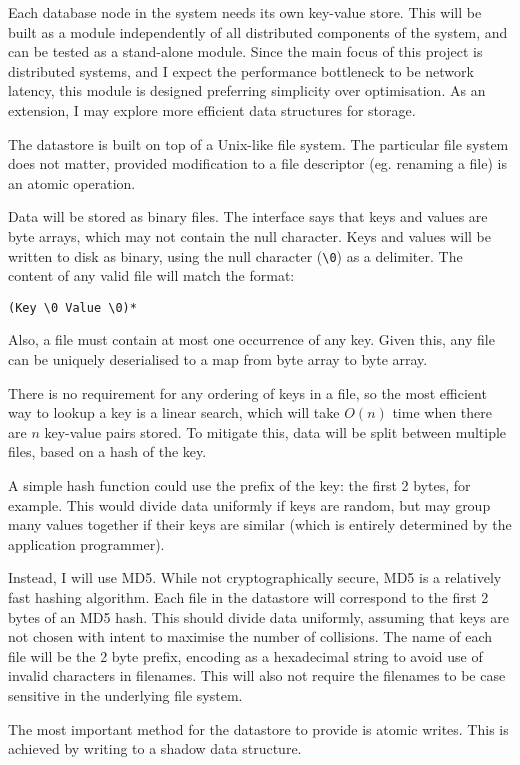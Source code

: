 \documentclass[12pt,a4paper,twoside,openright]{report}
\begin{document}
Each database node in the system needs its own key-value store. This will be built as a module independently of all distributed components of the system, and can be tested as a stand-alone module. Since the main focus of this project is distributed systems, and I expect the performance bottleneck to be network latency, this module is designed preferring simplicity over optimisation. As an extension, I may explore more efficient data structures for storage.

The datastore is built on top of a Unix-like file system. The particular file system does not matter, provided modification to a file descriptor (eg. renaming a file) is an atomic operation.

Data will be stored as binary files. The interface says that keys and values are byte arrays, which may not contain the null character. Keys and values will be written to disk as binary, using the null character (\verb|\0|) as a delimiter. The content of any valid file will match the format:

\verb|(Key \0 Value \0)*|

Also, a file must contain at most one occurrence of any key. Given this, any file can be uniquely deserialised to a map from byte array to byte array.

There is no requirement for any ordering of keys in a file, so the most efficient way to lookup a key is a linear search, which will take $O(n)$ time when there are $n$ key-value pairs stored. To mitigate this, data will be split between multiple files, based on a hash of the key.

A simple hash function could use the prefix of the key: the first 2 bytes, for example. This would divide data uniformly if keys are random, but may group many values together if their keys are similar (which is entirely determined by the application programmer).

Instead, I will use MD5. While not cryptographically secure, MD5 is a relatively fast hashing algorithm. Each file in the datastore will correspond to the first 2 bytes of an MD5 hash. This should divide data uniformly, assuming that keys are not chosen with intent to maximise the number of collisions. The name of each file will be the 2 byte prefix, encoding as a hexadecimal string to avoid use of invalid characters in filenames. This will also not require the filenames to be case sensitive in the underlying file system.

The most important method for the datastore to provide is atomic writes. This is achieved by writing to a shadow data structure.
\end{document}
